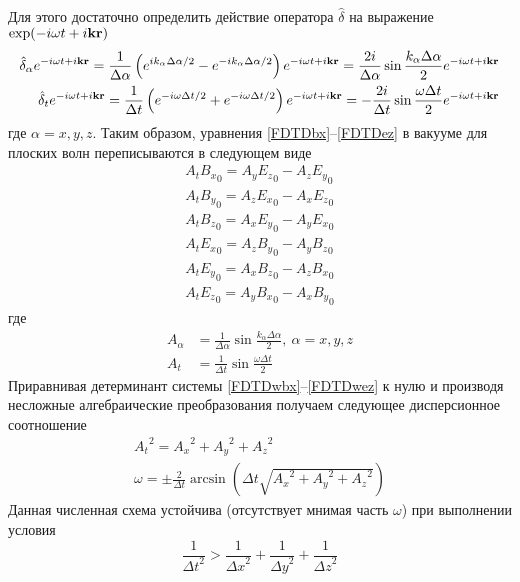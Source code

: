 Для этого достаточно определить действие оператора $\hat{\delta}$ на выражение $\exp(-i\omega t + i \vb{kr})$
\begin{align}
    \hat{\delta}_\alpha e^{-i\omega t + i \vb{kr}} = \frac{1}{\Delta \alpha} \left( e^{i k_\alpha \Delta \alpha/2} - e^{-i k_\alpha \Delta \alpha/2} \right) e^{-i\omega t + i \vb{kr}} = \frac{2i}{\Delta \alpha} \sin{\frac{k_\alpha \Delta \alpha}{2}} e^{-i\omega t + i \vb{kr}}  \\
    \hat{\delta}_t e^{-i\omega t + i \vb{kr}} = \frac{1}{\Delta t} \left( e^{-i \omega \Delta t/2} + e^{-i \omega \Delta t/2} \right) e^{-i\omega t + i \vb{kr}} = -\frac{2i}{\Delta t} \sin{\frac{\omega \Delta t}{2}} e^{-i\omega t + i \vb{kr}}
\end{align}
где $\alpha=x,y,z$.
Таким образом, уравнения \eqref{FDTDbx}--\eqref{FDTDez} в вакууме для плоских волн переписываются в следующем виде
\begin{align}
    \label{FDTDwbx}
    A_t {B_x}_0 = A_y{E_z}_0 - A_z{E_y}_0 \\
    \label{FDTDwby}
    A_t {B_y}_0 = A_z{E_x}_0 - A_x{E_z}_0 \\
    \label{FDTDwbz}
    A_t {B_z}_0 = A_x{E_y}_0 - A_y{E_x}_0 \\
    \label{FDTDwex}
    A_t {E_x}_0 = A_z{B_y}_0 - A_y{B_z}_0 \\
    \label{FDTDwey}
    A_t {E_y}_0 = A_x{B_z}_0 - A_z{B_x}_0 \\
    \label{FDTDwez}
    A_t {E_z}_0 = A_y{B_x}_0 - A_x{B_y}_0
\end{align}
где
\begin{align}
    A_\alpha &=\frac{1}{\Delta\alpha}\sin{\frac{k_\alpha\Delta \alpha}{2}},\ \alpha=x,y,z \\
    A_t &=\frac{1}{\Delta t}\sin{\frac{\omega\Delta t}{2}}
\end{align}
Приравнивая детерминант системы \eqref{FDTDwbx}--\eqref{FDTDwez} к нулю и производя несложные алгебраические преобразования получаем следующее дисперсионное соотношение
\begin{gather}
    \label{FDTDdisp}
    {A_t}^2={A_x}^2+{A_y}^2+{A_z}^2 \\
    \label{FDTDomega}
    \omega = \pm \frac{2}{\Delta t} \arcsin{\left(\Delta t \sqrt{{A_x}^2+{A_y}^2+{A_z}^2} \right)}
\end{gather}
Данная численная схема устойчива (отсутствует мнимая часть $\omega$) при выполнении условия
\begin{equation}
    \label{CournatFDTD}
    \frac{1}{{\Delta t}^2} > \frac{1}{{\Delta x}^2} + \frac{1}{{\Delta y}^2} + \frac{1}{{\Delta z}^2}
\end{equation}
